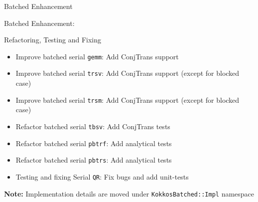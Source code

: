 \begin{frame}[fragile]{Batched Enhancement}
  
  {\Huge Batched Enhancement:}
  \vspace{10pt}

  Refactoring, Testing and Fixing
  \begin{itemize}
  \item Improve batched serial \texttt{gemm}: Add ConjTrans support
  \item Improve batched serial \texttt{trsv}: Add ConjTrans support (except for blocked case)
  \item Improve batched serial \texttt{trsm}: Add ConjTrans support (except for blocked case)
  \item Refactor batched serial \texttt{tbsv}: Add ConjTrans tests
  \item Refactor batched serial \texttt{pbtrf}: Add analytical tests
  \item Refactor batched serial \texttt{pbtrs}: Add analytical tests
  \item Testing and fixing Serial \texttt{QR}: Fix bugs and add unit-tests
  \end{itemize}
  
  \textbf{Note:} Implementation details are moved under \texttt{KokkosBatched::Impl} namespace
  
  
\end{frame}
  
  
